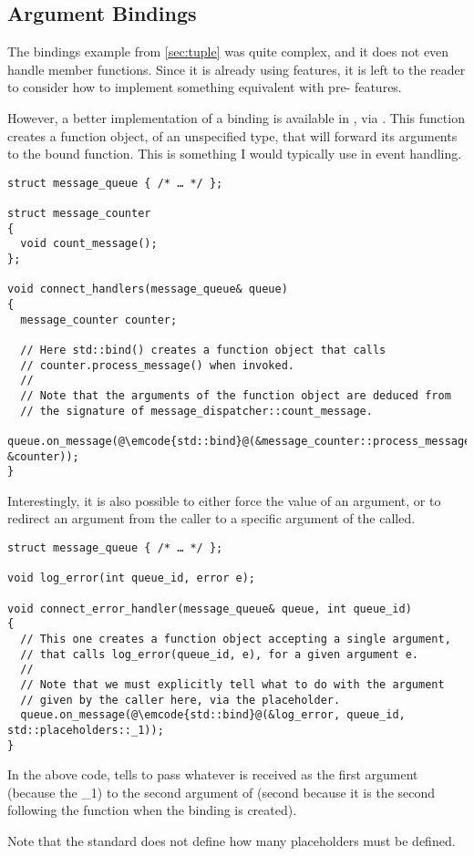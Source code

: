 \subsection{Argument Bindings}

\problemtitle

The bindings example from \ref{sec:tuple} was quite complex, and it
does not even handle member functions. Since it is already using
 features, it is left to the reader to consider how to implement
something equivalent with pre- features.

\solutiontitle

%
%
However, a better implementation of a binding is available in ,
via . This function creates a function object, of an
unspecified type, that will forward its arguments to the bound
function. This is something I would typically use in event handling.

\begin{lstlisting}
struct message_queue { /* … */ };

struct message_counter
{
  void count_message();
};

void connect_handlers(message_queue& queue)
{
  message_counter counter;

  // Here std::bind() creates a function object that calls
  // counter.process_message() when invoked.
  //
  // Note that the arguments of the function object are deduced from
  // the signature of message_dispatcher::count_message.
  queue.on_message(@\emcode{std::bind}@(&message_counter::process_message, &counter));
}
\end{lstlisting}

Interestingly, it is also possible to either force the value of an
argument, or to redirect an argument from the caller to a specific
argument of the called.

\begin{lstlisting}
struct message_queue { /* … */ };

void log_error(int queue_id, error e);

void connect_error_handler(message_queue& queue, int queue_id)
{
  // This one creates a function object accepting a single argument,
  // that calls log_error(queue_id, e), for a given argument e.
  //
  // Note that we must explicitly tell what to do with the argument
  // given by the caller here, via the placeholder.
  queue.on_message(@\emcode{std::bind}@(&log_error, queue_id, std::placeholders::_1));
}
\end{lstlisting}

In the above code,  tells
 to pass whatever is received as the first argument
(because the \_1) to the second argument of  (second
because it is the second following the function when the binding is
created).

Note that the standard does not define how many placeholders must be
defined.
